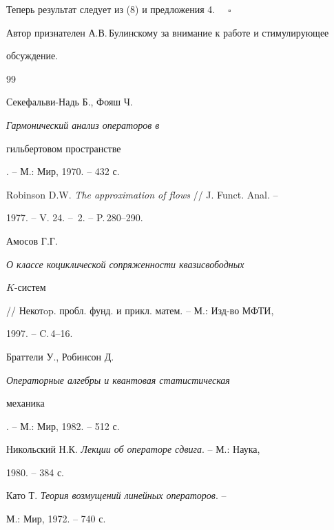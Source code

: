 Теперь результат следует из (8) и предложения 4. $\quad\square$





Автор признателен А.В.\,Булинскому за внимание к работе и стимулирующее


обсуждение.





\begin{thebibliography}{99}







Секефальви-Надь Б., Фояш Ч. {\em Гармонический анализ операторов в


гильбертовом пространстве}. -- М.: Мир, 1970. -- 432 с.




Robinson D.W. {\em The approximation of flows} // J. Funct. Anal. --


1977. -- V. 24. -- \No\,2. -- P.\,280--290.




Амосов Г.Г. {\em О классе коциклической сопряженности квазисвободных


$K$-систем} // Некотop. пробл. фунд. и прикл. матем. -- М.: Изд-во МФТИ,


1997. -- C.\,4--16.




Браттели У., Робинсон Д. {\em Операторные алгебры и квантовая статистическая


механика}. -- М.: Мир, 1982. -- 512 с.




Никольский Н.К. {\em Лекции об операторе сдвига}. -- М.: Наука,


1980. -- 384 с.




Като Т. {\em Теория возмущений линейных операторов}. --


М.: Мир, 1972. -- 740 с.





\end{thebibliography}





\vskip 2cm














\label{end}





